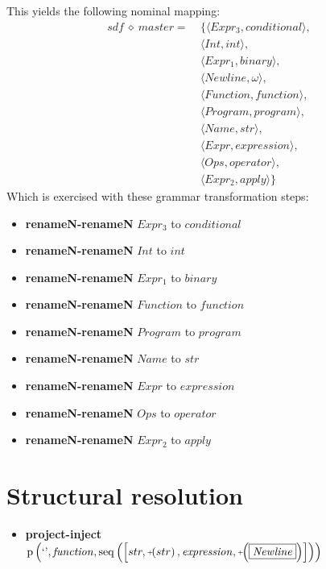 This yields the following nominal mapping:
\begin{align*}\mathit{sdf} \:\diamond\: \mathit{master} =\:& \{\langle \mathit{Expr_3},\mathit{conditional}\rangle,\\
 & \langle \mathit{Int},int\rangle,\\
 & \langle \mathit{Expr_1},\mathit{binary}\rangle,\\
 & \langle \mathit{Newline},\omega\rangle,\\
 & \langle \mathit{Function},\mathit{function}\rangle,\\
 & \langle \mathit{Program},\mathit{program}\rangle,\\
 & \langle \mathit{Name},str\rangle,\\
 & \langle \mathit{Expr},\mathit{expression}\rangle,\\
 & \langle \mathit{Ops},\mathit{operator}\rangle,\\
 & \langle \mathit{Expr_2},\mathit{apply}\rangle\}\end{align*}
 Which is exercised with these grammar transformation steps:

{\footnotesize\begin{itemize}
\item \textbf{renameN-renameN} $\mathit{Expr_3}$ to $\mathit{conditional}$
\item \textbf{renameN-renameN} $\mathit{Int}$ to $int$
\item \textbf{renameN-renameN} $\mathit{Expr_1}$ to $\mathit{binary}$
\item \textbf{renameN-renameN} $\mathit{Function}$ to $\mathit{function}$
\item \textbf{renameN-renameN} $\mathit{Program}$ to $\mathit{program}$
\item \textbf{renameN-renameN} $\mathit{Name}$ to $str$
\item \textbf{renameN-renameN} $\mathit{Expr}$ to $\mathit{expression}$
\item \textbf{renameN-renameN} $\mathit{Ops}$ to $\mathit{operator}$
\item \textbf{renameN-renameN} $\mathit{Expr_2}$ to $\mathit{apply}$
\end{itemize}}

\section{Structural resolution}
{\footnotesize\begin{itemize}
\item \textbf{project-inject}\\$\mathrm{p}\left(\text{`'},\mathit{function},\mathrm{seq}\left(\left[str, \plus \left(str\right), \mathit{expression}, \plus \left(\fbox{$\mathit{Newline}$}\right)\right]\right)\right)$
\end{itemize}}
